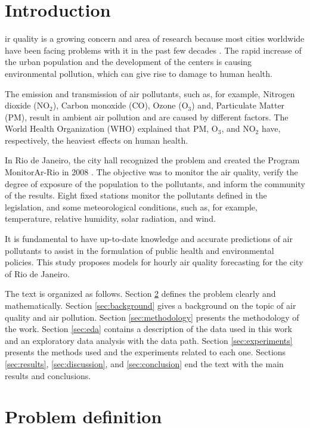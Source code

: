 \section{Introduction}
\label{sec:introduction}

ir quality is a growing concern and area
of research because most cities worldwide have been facing problems with it in
the past few decades \cite{mayer1999}. The rapid increase of the urban
population and the development of the centers is causing environmental
pollution, which can give rise to damage to human health. 

The emission and transmission of air pollutants, such as, for example, Nitrogen dioxide (NO$_2$), Carbon monoxide (CO), Ozone (O$_3$) and, Particulate Matter (PM), result in ambient air pollution and are caused by different factors. The World Health
Organization (WHO) explained \cite{who2006} that PM, O$_3$, and NO$_2$ have, respectively, the
heaviest effects on human health.

In Rio de Janeiro, the city hall recognized the problem and created the
Program MonitorAr-Rio in 2008 \cite{relatorio2011}. The objective was to monitor the air quality, verify the degree of exposure of the population to the pollutants, and inform the community of the results.
Eight fixed stations monitor the pollutants defined in the legislation,
and some meteorological conditions, such as, for example, temperature, relative humidity, solar radiation, and wind. 

It is fundamental to have up-to-date knowledge and accurate predictions of air pollutants to assist in the formulation of public health and
environmental policies. This study proposes models for hourly air
quality forecasting for the city of Rio de Janeiro. 

The text is organized as follows. Section \ref{sec:problem-definition} defines
the problem clearly and mathematically. Section \ref{sec:background} gives a
background on the topic of air quality and air pollution. Section \ref{sec:methodology} presents
the methodology of the work. Section \ref{sec:eda} contains a description of the data used in this
work and an exploratory data analysis with the
data path. Section \ref{sec:experiments} presents the
methods used and the experiments related to each one. Sections
\ref{sec:results}, \ref{sec:discussion}, and \ref{sec:conclusion} end the text
with the main results and conclusions. 


\section{Problem definition}
\label{sec:problem-definition}

